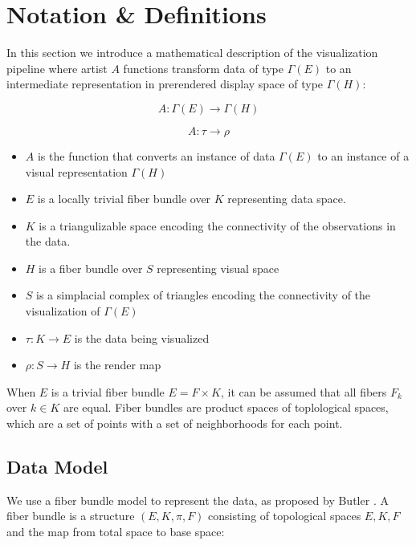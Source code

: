 \documentclass[../main.tex]{subfiles}
\begin{document}
\section{Notation \& Definitions}
In this section we introduce a mathematical description of the visualization pipeline where artist $A$ functions transform data of type $\Gamma(E)$ to an intermediate representation in prerendered display space of type $\Gamma(H)$:

\begin{equation}
    A: \Gamma(E) \rightarrow \Gamma(H)
    \label{eq:artist}
\end{equation}

\begin{equation}
    A: \tau \rightarrow \rho
\end{equation}

\begin{itemize}
\item $A$ is the function that converts an instance of data $\Gamma(E)$ to an instance of a visual representation $\Gamma(H)$ 
\item $E$ is a locally trivial fiber bundle over $K$ representing data space.
\item $K$ is a triangulizable space encoding the connectivity of the observations in the data. 
\item $H$ is a fiber bundle over $S$ representing visual space
\item $S$ is a simplacial complex of triangles encoding the connectivity of the visualization of $\Gamma(E)$
\item $\tau: K\rightarrow E$ is the data being visualized
\item $\rho: S \rightarrow H$ is the render map
\end{itemize}

When $E$ is a trivial fiber bundle $E = F \times K$, it can be assumed that all fibers $F_{k}$ over $k \in K$ are equal. Fiber bundles are product spaces of toplological spaces, which are a set of points with a set of neighborhoods for each point\cite{FiberBundle2020, rowlandFiberBundle}.

\subsection{Data Model}

We use a fiber bundle model to represent the data, as proposed by Butler 
\cite{butlerVectorBundleClassesForm1992,butlerVisualizationModelBased1989}. A fiber bundle is a structure $(E, K, \pi, F)$  consisting of topological spaces $E, K, F$ and the map from total space to base space:
\end{document}
